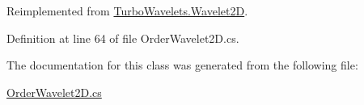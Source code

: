 Reimplemented from \hyperlink{class_turbo_wavelets_1_1_wavelet2_d_af0339475762d327f9d8ec019079cdc28}{Turbo\+Wavelets.\+Wavelet2\+D}.



Definition at line 64 of file Order\+Wavelet2\+D.\+cs.



The documentation for this class was generated from the following file\+:\begin{DoxyCompactItemize}
\item 
\hyperlink{_order_wavelet2_d_8cs}{Order\+Wavelet2\+D.\+cs}\end{DoxyCompactItemize}
